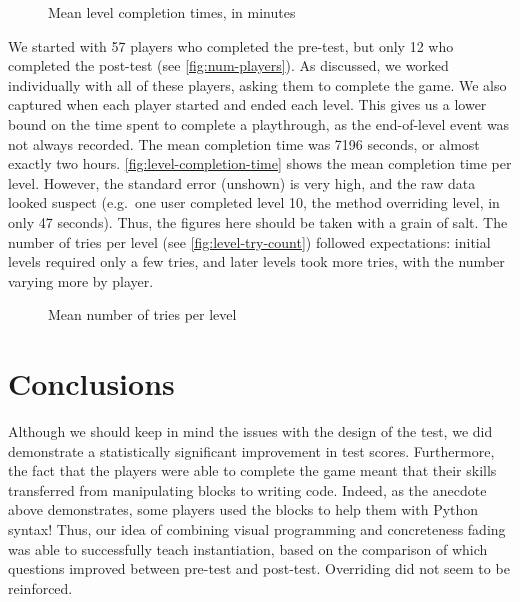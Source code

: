 \documentclass[12pt,notitlepage]{article}
\begin{document}
\begin{figure}
  \centering
  \caption{Mean level completion times, in minutes}\label{fig:level-completion-time}
\end{figure}

We started with 57 players who completed the pre-test, but only 12 who
completed the post-test (see \autoref{fig:num-players}). As discussed,
we worked individually with all of these players, asking them to
complete the game. We also captured when each player started and ended
each level. This gives us a lower bound on the time spent to complete
a playthrough, as the end-of-level event was not always recorded. The
mean completion time was 7196 seconds, or almost exactly two
hours. \autoref{fig:level-completion-time} shows the mean completion
time per level. However, the standard error (unshown) is very high,
and the raw data looked suspect (e.g.\ one user completed level 10,
the method overriding level, in only 47 seconds). Thus, the figures
here should be taken with a grain of salt. The number of tries per
level (see \autoref{fig:level-try-count}) followed expectations:
initial levels required only a few tries, and later levels took more
tries, with the number varying more by player.

\begin{figure}
  \centering
  \caption{Mean number of tries per level}\label{fig:level-try-count}
\end{figure}

\section{Conclusions}

Although we should keep in mind the issues with the design of the
test, we did demonstrate a statistically significant improvement in
test scores. Furthermore, the fact that the players were able to
complete the game meant that their skills transferred from
manipulating blocks to writing code. Indeed, as the anecdote above
demonstrates, some players used the blocks to help them with Python
syntax! Thus, our idea of combining visual programming and
concreteness fading was able to successfully teach instantiation,
based on the comparison of which questions improved between pre-test
and post-test. Overriding did not seem to be reinforced.
\end{document}
